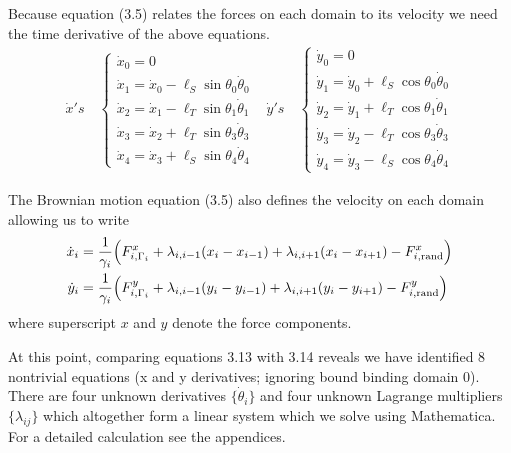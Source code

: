 		\noindent Because equation (3.5) relates the forces on each domain to its velocity we need the time derivative of the above equations. 
		\begin{align}
		\dot{x}'s \quad \begin{cases}
		\dot{x}_0 = 0 \\
		\dot{x}_1 = \dot{x}_0-\ell_S\sin\theta_0 \dot{\theta}_0 \\
		\dot{x}_2 = \dot{x}_1-\ell_T\sin\theta_1 \dot{\theta}_1 \\
		\dot{x}_3 = \dot{x}_2+\ell_T\sin\theta_3 \dot{\theta}_3 \\
		\dot{x}_4 = \dot{x}_3+\ell_S\sin\theta_4 \dot{\theta}_4
		\end{cases} &
		\dot{y}'s \quad \begin{cases}
		\dot{y}_0 = 0 \\
		\dot{y}_1 = \dot{y}_0 + \ell_S\cos\theta_0\dot{\theta}_0 \\
		\dot{y}_2 = \dot{y}_1 + \ell_T\cos\theta_1\dot{\theta}_1 \\
		\dot{y}_3 = \dot{y}_2 - \ell_T\cos\theta_3\dot{\theta}_3 \\
		\dot{y}_4 = \dot{y}_3 - \ell_S\cos\theta_4\dot{\theta}_4
		\end{cases} 
		\end{align}
		
		The Brownian motion equation (3.5) also defines the velocity on each domain allowing us to write
		\begin{align}
			\dot{x}_i &= \frac{1}{\gamma_i}\Big(F_{i,\Gamma_i}^x+ \lambda_{i,i-1}(x_i-x_{i-1})+\lambda_{i,i+1}(x_i-x_{i+1})-F_{i,\text{rand}}^x\Big)\\
			\dot{y}_i &= \frac{1}{\gamma_i}\Big(F_{i,\Gamma_i}^y+ \lambda_{i,i-1}(y_i-y_{i-1})+\lambda_{i,i+1}(y_i-y_{i+1})-F_{i,\text{rand}}^y\Big) \notag
		\end{align}
		where superscript $x$ and $y$ denote the force components. 
		
		 
		 At this point, comparing equations 3.13 with 3.14 reveals we have identified 8 nontrivial equations (x and y derivatives; ignoring bound binding domain 0). There are four unknown derivatives $\{\dot\theta_i\}$ and four unknown Lagrange multipliers $\{\lambda_{ij}\}$ which altogether form a linear system which we solve using Mathematica. For a detailed calculation see the appendices. 
		 
